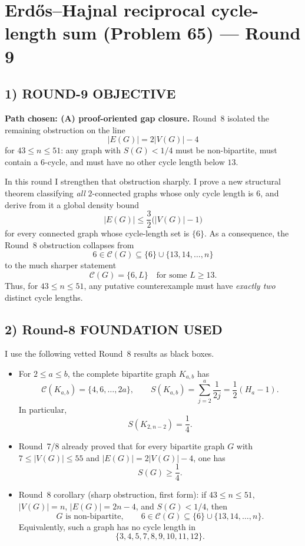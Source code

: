 \section{Erd\H{o}s--Hajnal reciprocal cycle-length sum (Problem 65) --- Round 9}

\subsection*{1) ROUND-9 OBJECTIVE}

\textbf{Path chosen: (A) proof-oriented gap closure.}
Round~8 isolated the remaining obstruction on the line
\[
|E(G)|=2|V(G)|-4
\]
for $43\le n\le 51$: any graph with $S(G)<1/4$ must be non-bipartite, must contain a $6$-cycle, and must have no other cycle length below $13$.

In this round I strengthen that obstruction sharply. I prove a new structural theorem classifying \emph{all} $2$-connected graphs whose only cycle length is $6$, and derive from it a global density bound
\[
|E(G)|\le \frac32\bigl(|V(G)|-1\bigr)
\]
for every connected graph whose cycle-length set is $\{6\}$.
As a consequence, the Round~8 obstruction collapses from
\[
6\in \mathcal C(G)\subseteq \{6\}\cup\{13,14,\dots,n\}
\]
to the much sharper statement
\[
\mathcal C(G)=\{6,L\}\quad\text{for some }L\ge 13.
\]
Thus, for $43\le n\le 51$, any putative counterexample must have \emph{exactly two} distinct cycle lengths.

\subsection*{2) Round-8 FOUNDATION USED}

I use the following vetted Round~8 results as black boxes.

\begin{itemize}
\item[(F1)] For $2\le a\le b$, the complete bipartite graph $K_{a,b}$ has
\[
\mathcal C(K_{a,b})=\{4,6,\dots,2a\},
\qquad
S(K_{a,b})=\sum_{j=2}^{a}\frac1{2j}=\frac12(H_a-1).
\]
In particular,
\[
S(K_{2,n-2})=\frac14.
\]

\item[(F2)] Round~7/8 already proved that for every bipartite graph $G$ with $7\le |V(G)|\le 55$ and $|E(G)|=2|V(G)|-4$, one has
\[
S(G)\ge \frac14.
\]

\item[(F3)] Round~8 corollary (sharp obstruction, first form): if $43\le n\le 51$, $|V(G)|=n$, $|E(G)|=2n-4$, and $S(G)<1/4$, then
\[
G\text{ is non-bipartite},
\qquad
6\in \mathcal C(G)\subseteq \{6\}\cup\{13,14,\dots,n\}.
\]
Equivalently, such a graph has no cycle length in
\[
\{3,4,5,7,8,9,10,11,12\}.
\]
\end{itemize}

